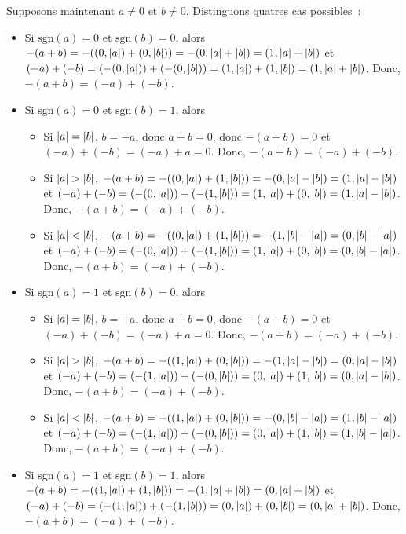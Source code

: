 Supposons maintenant $a \neq 0$ et $b \neq 0$. 
Distinguons quatres cas possibles : 
\begin{itemize}[nosep]
    \item Si $\mathrm{sgn}(a) = 0$ et $\mathrm{sgn}(b) = 0$, alors $-(a+b) = -((0,\abs{a}) + (0, \abs{b})) = -(0, \abs{a}+\abs{b}) = (1, \abs{a} + \abs{b})$ et $(-a) + (-b) = (-(0,\abs{a})) + (-(0, \abs{b})) = (1, \abs{a}) + (1, \abs{b}) = (1, \abs{a} + \abs{b})$.
        Donc, $-(a+b) = (-a) + (-b)$.
    \item Si $\mathrm{sgn}(a) = 0$ et $\mathrm{sgn}(b) = 1$, alors
        \begin{itemize}[nosep]
            \item Si $\abs{a} = \abs{b}$, $b = -a$, donc $a + b = 0$, donc $-(a+b) = 0$ et $(-a) + (-b) = (-a) + a = 0$.
                Donc, $-(a+b) = (-a) + (-b)$.
            \item Si $\abs{a} > \abs{b}$, $-(a+b) = -((0,\abs{a}) + (1, \abs{b})) = -(0, \abs{a} - \abs{b}) = (1, \abs{a} - \abs{b})$ et $(-a) + (-b) = (-(0, \abs{a})) + (-(1, \abs{b})) = (1, \abs{a}) + (0, \abs{b}) = (1, \abs{a} - \abs{b})$.
                Donc, $-(a+b) = (-a) + (-b)$.
            \item Si $\abs{a} < \abs{b}$, $-(a+b) = -((0,\abs{a}) + (1, \abs{b})) = -(1, \abs{b} - \abs{a}) = (0, \abs{b} - \abs{a})$ et $(-a) + (-b) = (-(0, \abs{a})) + (-(1, \abs{b})) = (1, \abs{a}) + (0, \abs{b}) = (0, \abs{b} - \abs{a})$.
                Donc, $-(a+b) = (-a) + (-b)$.
        \end{itemize}
    \item Si $\mathrm{sgn}(a) = 1$ et $\mathrm{sgn}(b) = 0$, alors
        \begin{itemize}[nosep]
            \item Si $\abs{a} = \abs{b}$, $b = -a$, donc $a + b = 0$, donc $-(a+b) = 0$ et $(-a) + (-b) = (-a) + a = 0$.
                Donc, $-(a+b) = (-a) + (-b)$.
            \item Si $\abs{a} > \abs{b}$, $-(a+b) = -((1,\abs{a}) + (0, \abs{b})) = -(1, \abs{a} - \abs{b}) = (0, \abs{a} - \abs{b})$ et $(-a) + (-b) = (-(1, \abs{a})) + (-(0, \abs{b})) = (0, \abs{a}) + (1, \abs{b}) = (0, \abs{a} - \abs{b})$.
                Donc, $-(a+b) = (-a) + (-b)$.
            \item Si $\abs{a} < \abs{b}$, $-(a+b) = -((1,\abs{a}) + (0, \abs{b})) = -(0, \abs{b} - \abs{a}) = (1, \abs{b} - \abs{a})$ et $(-a) + (-b) = (-(1, \abs{a})) + (-(0, \abs{b})) = (0, \abs{a}) + (1, \abs{b}) = (1, \abs{b} - \abs{a})$.
                Donc, $-(a+b) = (-a) + (-b)$.
        \end{itemize}
    \item Si $\mathrm{sgn}(a) = 1$ et $\mathrm{sgn}(b) = 1$, alors $-(a+b) = -((1,\abs{a}) + (1, \abs{b})) = -(1, \abs{a}+\abs{b}) = (0, \abs{a} + \abs{b})$ et $(-a) + (-b) = (-(1,\abs{a})) + (-(1, \abs{b})) = (0, \abs{a}) + (0, \abs{b}) = (0, \abs{a} + \abs{b})$.
        Donc, $-(a+b) = (-a) + (-b)$.
\end{itemize}

